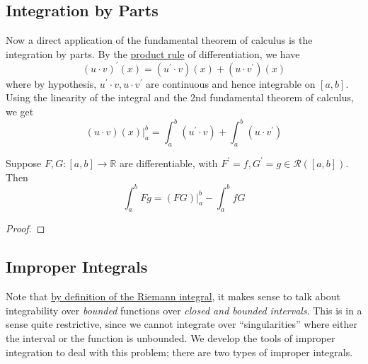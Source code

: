 \subsection{Integration by Parts}

  Now a direct application of the fundamental theorem of calculus is the integration by parts. By the \hyperref[thm:product_rule]{product rule} of differentiation, we have
  \begin{equation}
    (u \cdot v)^\prime (x) = (u^\prime \cdot v)(x) + (u \cdot v^\prime) (x)
  \end{equation}
  where by hypothesis, $u^\prime \cdot v, u \cdot v^\prime$ are continuous and hence integrable on $[a, b]$. Using the linearity of the integral and the 2nd fundamental theorem of calculus, we get
  \begin{equation}
    (u \cdot v) (x) \big|^b_a = \int_a^b (u^\prime \cdot v) + \int_a^b (u \cdot v^\prime) 
  \end{equation}

  \begin{theorem}
    \label{thm:integration-by-parts}
    Suppose $F, G: [a, b] \to \mathbb{R}$ are differentiable, with $F^\prime = f, G^\prime = g \in \mathcal{R}([a, b])$. Then 
    \begin{equation}
      \int_a^b Fg = (FG) \big|_a^b - \int_a^b fG
    \end{equation}
  \end{theorem} 
  \begin{proof}
    
  \end{proof}

\subsection{Improper Integrals}

  Note that \hyperref[def:riemann-integral]{by definition of the Riemann integral}, it makes sense to talk about integrability over \textit{bounded} functions over \textit{closed and bounded intervals}. This is in a sense quite restrictive, since we cannot integrate over ``singularities'' where either the interval or the function is unbounded. We develop the tools of improper integration to deal with this problem; there are two types of improper integrals. 

